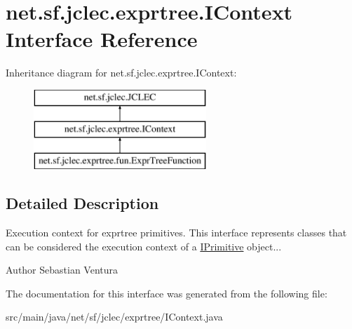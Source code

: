 \hypertarget{interfacenet_1_1sf_1_1jclec_1_1exprtree_1_1_i_context}{\section{net.\-sf.\-jclec.\-exprtree.\-I\-Context Interface Reference}
\label{interfacenet_1_1sf_1_1jclec_1_1exprtree_1_1_i_context}
}
Inheritance diagram for net.\-sf.\-jclec.\-exprtree.\-I\-Context\-:\begin{figure}[H]
\begin{center}
\leavevmode
\includegraphics[height=3.000000cm]{interfacenet_1_1sf_1_1jclec_1_1exprtree_1_1_i_context}
\end{center}
\end{figure}


\subsection{Detailed Description}
Execution context for exprtree primitives. This interface represents classes that can be considered the execution context of a \hyperlink{interfacenet_1_1sf_1_1jclec_1_1exprtree_1_1_i_primitive}{I\-Primitive} object...

\begin{DoxyAuthor}{Author}
Sebastian Ventura 
\end{DoxyAuthor}


The documentation for this interface was generated from the following file\-:\begin{DoxyCompactItemize}
\item 
src/main/java/net/sf/jclec/exprtree/I\-Context.\-java\end{DoxyCompactItemize}
